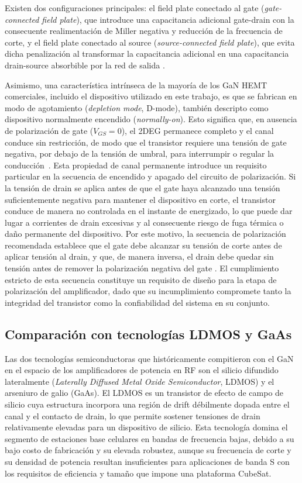 Existen dos configuraciones principales: el field plate conectado al gate (\textit{gate-connected field plate}), que introduce una capacitancia adicional gate-drain con la consecuente realimentación de Miller negativa y reducción de la frecuencia de corte, y el field plate conectado al source (\textit{source-connected field plate}), que evita dicha penalización al transformar la capacitancia adicional en una capacitancia drain-source absorbible por la red de salida \cite{Mishra2008}.

Asimismo, una característica intrínseca de la mayoría de los GaN HEMT comerciales, incluido el dispositivo utilizado en este trabajo, es que se fabrican en modo de agotamiento (\textit{depletion mode}, D-mode), también descripto como dispositivo normalmente encendido (\textit{normally-on}). Esto significa que, en ausencia de polarización de gate ($V_{GS}=0$), el 2DEG permanece completo y el canal conduce sin restricción, de modo que el transistor requiere una tensión de gate negativa, por debajo de la tensión de umbral, para interrumpir o regular la conducción~\cite{Macom}. Esta propiedad de canal permanente introduce un requisito particular en la secuencia de encendido y apagado del circuito de polarización. Si la tensión de drain se aplica antes de que el gate haya alcanzado una tensión suficientemente negativa para mantener el dispositivo en corte, el transistor conduce de manera no controlada en el instante de energizado, lo que puede dar lugar a corrientes de drain excesivas y al consecuente riesgo de fuga térmica o daño permanente del dispositivo. Por este motivo, la secuencia de polarización recomendada establece que el gate debe alcanzar su tensión de corte antes de aplicar tensión al drain, y que, de manera inversa, el drain debe quedar sin tensión antes de remover la polarización negativa del gate \cite{Macom}. El cumplimiento estricto de esta secuencia constituye un requisito de diseño para la etapa de polarización del amplificador, dado que su incumplimiento compromete tanto la integridad del transistor como la confiabilidad del sistema en su conjunto.

\subsection{Comparación con tecnologías LDMOS y GaAs}
Las dos tecnologías semiconductoras que históricamente compitieron con el GaN en el espacio de los amplificadores de potencia en RF son el silicio difundido lateralmente (\textit{Laterally Diffused Metal Oxide Semiconductor}, LDMOS) y el arseniuro de galio (GaAs). El LDMOS es un transistor de efecto de campo de silicio cuya estructura incorpora una región de drift débilmente dopada entre el canal y el contacto de drain, lo que permite sostener tensiones de drain relativamente elevadas para un dispositivo de silicio. Esta tecnología domina el segmento de estaciones base celulares en bandas de frecuencia bajas, debido a su bajo costo de fabricación y su elevada robustez, aunque su frecuencia de corte y su densidad de potencia resultan insuficientes para aplicaciones de banda S con los requisitos de eficiencia y tamaño que impone una plataforma CubeSat.

